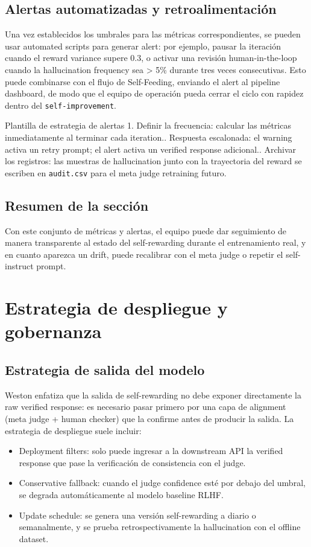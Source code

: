 \documentclass[a4paper]{article}
\begin{document}
\subsection{Alertas automatizadas y retroalimentación}
Una vez establecidos los umbrales para las métricas correspondientes, se pueden usar automated scripts para generar alert: por ejemplo, pausar la iteración cuando el reward variance supere 0.3, o activar una revisión human-in-the-loop cuando la hallucination frequency sea > 5\% durante tres veces consecutivas. Esto puede combinarse con el flujo de Self-Feeding, enviando el alert al pipeline dashboard, de modo que el equipo de operación pueda cerrar el ciclo con rapidez dentro del \texttt{self-improvement}.

\begin{knowledgebox}{Plantilla de estrategia de alertas}
1. Definir la frecuencia: calcular las métricas inmediatamente al terminar cada iteration.. Respuesta escalonada: el warning activa un retry prompt; el alert activa un verified response adicional.. Archivar los registros: las muestras de hallucination junto con la trayectoria del reward se escriben en \texttt{audit.csv} para el meta judge retraining futuro.
\end{knowledgebox}

\subsection{Resumen de la sección}
Con este conjunto de métricas y alertas, el equipo puede dar seguimiento de manera transparente al estado del self-rewarding durante el entrenamiento real, y en cuanto aparezca un drift, puede recalibrar con el meta judge o repetir el self-instruct prompt.
\section{Estrategia de despliegue y gobernanza}
\subsection{Estrategia de salida del modelo}
Weston enfatiza que la salida de self-rewarding no debe exponer directamente la raw verified response: es necesario pasar primero por una capa de alignment (meta judge + human checker) que la confirme antes de producir la salida. La estrategia de despliegue suele incluir:
\begin{itemize}
    \item Deployment filters: solo puede ingresar a la downstream API la verified response que pase la verificación de consistencia con el judge.
    \item Conservative fallback: cuando el judge confidence esté por debajo del umbral, se degrada automáticamente al modelo baseline RLHF.
    \item Update schedule: se genera una versión self-rewarding a diario o semanalmente, y se prueba retrospectivamente la hallucination con el offline dataset.
\end{itemize}
\end{document}
